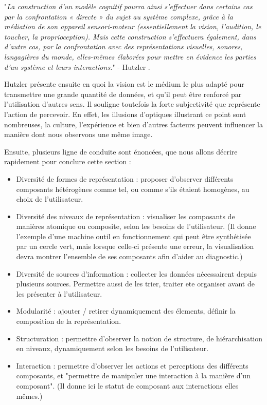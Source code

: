 		"\textit{La construction d'un modèle cognitif pourra ainsi s'effectuer dans certains cas par la confrontation « directe » du sujet au système complexe, grâce à la médiation de son appareil sensori-moteur (essentiellement la vision, l'audition, le toucher, la proprioception). Mais cette construction s'effectuera également, dans d'autre cas, par la confrontation avec des représentations visuelles, sonores, langagières du monde, elles-mêmes élaborées pour mettre en évidence les parties d'un système et leurs interactions.}" - Hutzler \cite{hutzler_du_2000}.
		
		Hutzler présente ensuite en quoi la vision est le médium le plus adapté pour transmettre une grande quantité de données, et qu'il peut être renforcé par l'utilisation d'autres sens. Il souligne toutefois la forte subjectivité que représente l'action de percevoir. En effet, les illusions d'optiques illustrant ce point sont nombreuses, la culture, l'expérience et bien d'autres facteurs peuvent influencer la manière dont nous observons une même image.
		
		Ensuite, plusieurs ligne de conduite sont énoncées, que nous allons décrire rapidement pour conclure cette section :
		\begin{itemize}
			\item Diversité de formes de représentation : proposer d'observer différents composants hétérogènes comme tel, ou comme s'ils étaient homogènes, au choix de l'utilisateur.
			\item Diversité des niveaux de représentation : visualiser les composants de manières atomique ou composite, selon les besoins de l'utilisateur. (Il donne l'exemple d'une machine outil en fonctionnement qui peut être synthétisée par un cercle vert, mais lorsque celle-ci présente une erreur, la visualisation devra montrer l'ensemble de ses composants afin d'aider au diagnostic.)
			\item Diversité de sources d'information : collecter les données nécessairent depuis plusieurs sources. Permettre aussi de les trier, traiter ete organiser avant de les présenter à l'utilisateur.
			\item Modularité : ajouter / retirer dynamiquement des élements, définir la composition de la représentation.
			\item Structuration : permettre d'observer la notion de structure, de hiérarchisation en niveaux, dynamiquement selon les besoins de l'utilisateur.
			\item Interaction : permettre d'observer les actions et perceptions des différents composants, et "permettre de manipuler une interaction à la manière d'un composant". (Il donne ici le statut de composant aux interactions elles mêmes.)
		\end{itemize}
		
